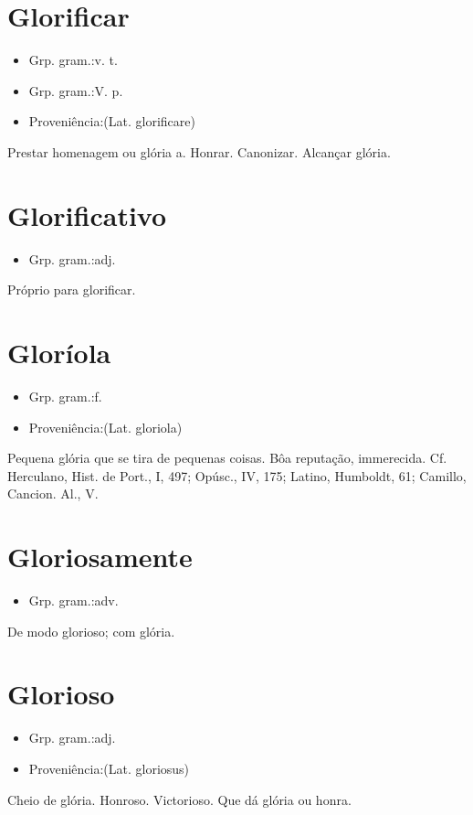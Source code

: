\section{Glorificar}
\begin{itemize}
\item {Grp. gram.:v. t.}
\end{itemize}
\begin{itemize}
\item {Grp. gram.:V. p.}
\end{itemize}
\begin{itemize}
\item {Proveniência:(Lat. \textunderscore glorificare\textunderscore )}
\end{itemize}
Prestar homenagem ou glória a.
Honrar.
Canonizar.
Alcançar glória.
\section{Glorificativo}
\begin{itemize}
\item {Grp. gram.:adj.}
\end{itemize}
Próprio para glorificar.
\section{Gloríola}
\begin{itemize}
\item {Grp. gram.:f.}
\end{itemize}
\begin{itemize}
\item {Proveniência:(Lat. \textunderscore gloriola\textunderscore )}
\end{itemize}
Pequena glória que se tira de pequenas coisas.
Bôa reputação, immerecida. Cf. Herculano, \textunderscore Hist. de Port.\textunderscore , I, 497; \textunderscore Opúsc.\textunderscore , IV, 175; Latino, \textunderscore Humboldt\textunderscore , 61; Camillo, \textunderscore Cancion. Al.\textunderscore , V.
\section{Gloriosamente}
\begin{itemize}
\item {Grp. gram.:adv.}
\end{itemize}
De modo glorioso; com glória.
\section{Glorioso}
\begin{itemize}
\item {Grp. gram.:adj.}
\end{itemize}
\begin{itemize}
\item {Proveniência:(Lat. \textunderscore gloriosus\textunderscore )}
\end{itemize}
Cheio de glória.
Honroso.
Victorioso.
Que dá glória ou honra.
